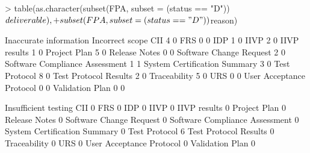 \documentclass{article}
\begin{document}
\begin{Schunk}
\begin{Sinput}
> table(as.character(subset(FPA, subset = (status == "D"))$deliverable),
+       subset(FPA, subset = (status == "D"))$reason)
\end{Sinput}
\begin{Soutput}
                                 Inaccurate information Incorrect scope
  CII                                                 4               0
  FRS                                                 0               0
  IDP                                                 1               0
  IIVP                                                2               0
  IIVP results                                        1               0
  Project Plan                                        5               0
  Release Notes                                       0               0
  Software Change Request                             2               0
  Software Compliance Assessment                      1               1
  System Certification Summary                        3               0
  Test Protocol                                       8               0
  Test Protocol Results                               2               0
  Traceability                                        5               0
  URS                                                 0               0
  User Acceptance Protocol                            0               0
  Validation Plan                                     0               0
                                
                                 Insufficient testing
  CII                                               0
  FRS                                               0
  IDP                                               0
  IIVP                                              0
  IIVP results                                      0
  Project Plan                                      0
  Release Notes                                     0
  Software Change Request                           0
  Software Compliance Assessment                    0
  System Certification Summary                      0
  Test Protocol                                     6
  Test Protocol Results                             0
  Traceability                                      0
  URS                                               0
  User Acceptance Protocol                          0
  Validation Plan                                   0
                                

\end{Soutput}
\end{Schunk}
\end{document}
